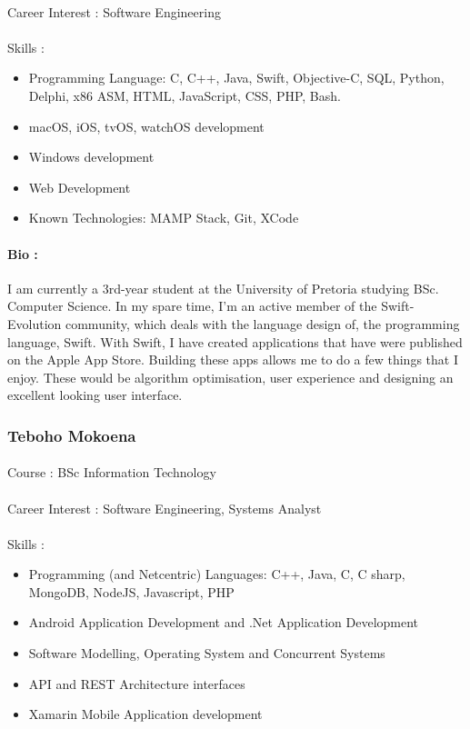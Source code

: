 \documentclass[11pt]{article}
\begin{document}
\paragraph{}Career Interest : Software Engineering
\paragraph{}Skills :
\begin{itemize}

\item Programming Language: C, C++, Java, Swift, Objective-C, SQL, Python, Delphi, x86 ASM, HTML, JavaScript, CSS, PHP, Bash.
\item macOS, iOS, tvOS, watchOS development
\item Windows development 
\item Web Development
\item Known Technologies: MAMP Stack, Git, XCode
\end{itemize}
\paragraph{Bio :}I am currently a 3rd-year student at the University of Pretoria studying BSc. Computer Science. In my spare time, I'm an active member of the Swift-Evolution community, which deals with the language design of, the programming language, Swift. With Swift, I have created applications that have were published on the Apple App Store. Building these apps allows me to do a few things that I enjoy. These would be algorithm optimisation, user experience and designing an excellent looking user interface.

\subsubsection{Teboho Mokoena}
\paragraph{}Course : BSc Information Technology 
\paragraph{}Career Interest : Software Engineering, Systems Analyst
\paragraph{}Skills :
\begin{itemize}
\item Programming (and Netcentric) Languages: C++, Java, C, C sharp, MongoDB, NodeJS, Javascript, PHP
\item Android Application Development and .Net Application Development
\item Software Modelling, Operating System and Concurrent Systems
\item API and REST Architecture interfaces
\item Xamarin Mobile Application development
\end{itemize}
\end{document}
